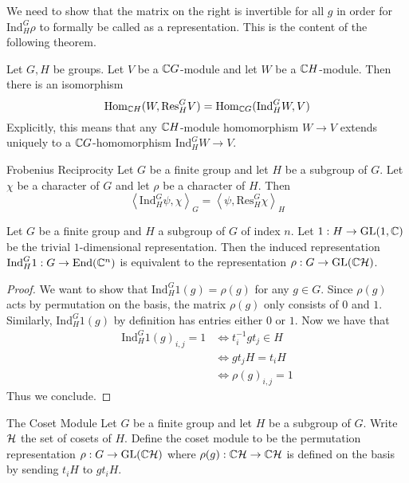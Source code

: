 \documentclass[a4paper]{article}
\begin{document}
We need to show that the matrix on the right is invertible for all $g$ in order for $\text{Ind}_H^G\rho$ to formally be called as a representation. This is the content of the following theorem. 

\begin{prp}{}{} Let $G,H$ be groups. Let $V$ be a $\mathbb{C} G$-module and let $W$ be a $\mathbb{C} H$-module. Then there is an isomorphism $$\operatorname{Hom}_{\mathbb{C} H}(W,\text{Res}_H^GV)=\operatorname{Hom}_{\mathbb{C} G}(\text{Ind}_H^GW,V)$$ Explicitly, this means that any $\mathbb{C} H$-module homomorphism $W\to V$ extends uniquely to a $\mathbb{C} G$-homomorphism $\text{Ind}_H^GW\to V$. 
\end{prp}

\begin{thm}{Frobenius Reciprocity}{} Let $G$ be a finite group and let $H$ be a subgroup of $G$. Let $\chi$ be a character of $G$ and let $\rho$ be a character of $H$. Then $$\left\langle\text{Ind}_H^G\psi,\chi\right\rangle_G=\left\langle\psi,\text{Res}_H^G\chi\right\rangle_H$$
\end{thm}

\begin{prp}{}{} Let $G$ be a finite group and $H$ a subgroup of $G$ of index $n$. Let $1:H\to\text{GL}(1,\mathbb{C})$ be the trivial $1$-dimensional representation. Then the induced representation $\text{Ind}_H^G1:G\to\text{End}(\mathbb{C}^n)$ is equivalent to the representation $\rho:G\to\text{GL}(\mathbb{C}\mathcal{H})$. \tcbline
\begin{proof}
We want to show that $\text{Ind}_H^G1(g)=\rho(g)$ for any $g\in G$. Since $\rho(g)$ acts by permutation on the basis, the matrix $\rho(g)$ only consists of $0$ and $1$. Similarly, $\text{Ind}_H^G1(g)$ by definition has entries either $0$ or $1$. Now we have that 
\begin{align*}
\text{Ind}_H^G1(g)_{i,j}=1&\iff t_i^{-1}gt_j\in H\\
&\iff gt_jH=t_iH\\
&\iff\rho(g)_{i,j}=1
\end{align*}
Thus we conclude. 
\end{proof}
\end{prp}

\begin{defn}{The Coset Module}{} Let $G$ be a finite group and let $H$ be a subgroup of $G$. Write $\mathcal{H}$ the set of cosets of $H$. Define the coset module to be the permutation representation $\rho:G\to\text{GL}(\mathbb{C}\mathcal{H})$ where $\rho(g):\mathbb{C}\mathcal{H}\to\mathbb{C}\mathcal{H}$ is defined on the basis by sending $t_iH$ to $gt_iH$. 
\end{defn}
\end{document}
